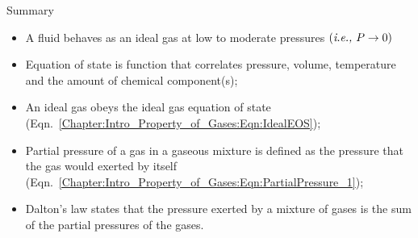    
\clearpage   
\begin{FinalSummaryBlock}{Summary}
    \begin{itemize}
       \item A fluid behaves as an ideal gas at low to moderate pressures $\left(\text{{\it i.e., }} P\rightarrow 0\right)$
       \item Equation of state is function that correlates pressure, volume, temperature and the amount of chemical component(s);
       \item An ideal gas obeys the ideal gas equation of state (Eqn.~\ref{Chapter:Intro_Property_of_Gases:Eqn:IdealEOS});
       \item Partial pressure of a gas in a gaseous mixture is defined as the pressure that the gas would exerted by itself (Eqn.~\ref{Chapter:Intro_Property_of_Gases:Eqn:PartialPressure_1});
       \item Dalton's law states that the pressure exerted by a mixture of gases is the sum of the partial pressures of the gases.
    \end{itemize}
\end{FinalSummaryBlock}
